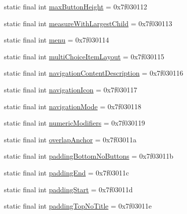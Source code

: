 \begin{DoxyCompactItemize}
\item 
static final int \mbox{\hyperlink{classandroid_1_1support_1_1design_1_1_r_1_1attr_ad6bd48f1f9241d8d9d51d7e07a5dc414}{max\+Button\+Height}} = 0x7f030112
\item 
static final int \mbox{\hyperlink{classandroid_1_1support_1_1design_1_1_r_1_1attr_abd4901da4b129c6f63b6ea0541aa8e09}{measure\+With\+Largest\+Child}} = 0x7f030113
\item 
static final int \mbox{\hyperlink{classandroid_1_1support_1_1design_1_1_r_1_1attr_a0b206635c3ea3883eb3af84863d37584}{menu}} = 0x7f030114
\item 
static final int \mbox{\hyperlink{classandroid_1_1support_1_1design_1_1_r_1_1attr_abc4a87a62e1572b883a67aa399ffe35e}{multi\+Choice\+Item\+Layout}} = 0x7f030115
\item 
static final int \mbox{\hyperlink{classandroid_1_1support_1_1design_1_1_r_1_1attr_adaadd10648090e6b2f268643da9ec3c2}{navigation\+Content\+Description}} = 0x7f030116
\item 
static final int \mbox{\hyperlink{classandroid_1_1support_1_1design_1_1_r_1_1attr_a03bf46fdb71dfdbac72b15e3efe275df}{navigation\+Icon}} = 0x7f030117
\item 
static final int \mbox{\hyperlink{classandroid_1_1support_1_1design_1_1_r_1_1attr_a98ccf0c896c65512c88eaa5f71f6aa7c}{navigation\+Mode}} = 0x7f030118
\item 
static final int \mbox{\hyperlink{classandroid_1_1support_1_1design_1_1_r_1_1attr_ac310597451040d4fb015db1b10a08767}{numeric\+Modifiers}} = 0x7f030119
\item 
static final int \mbox{\hyperlink{classandroid_1_1support_1_1design_1_1_r_1_1attr_a38b3cd3ac2e4fc75a99b4c00c01d969e}{overlap\+Anchor}} = 0x7f03011a
\item 
static final int \mbox{\hyperlink{classandroid_1_1support_1_1design_1_1_r_1_1attr_a5c03c8654610ded8325a6a89aed8adb1}{padding\+Bottom\+No\+Buttons}} = 0x7f03011b
\item 
static final int \mbox{\hyperlink{classandroid_1_1support_1_1design_1_1_r_1_1attr_a92f0312d6082074b79517cc3af4cd8c5}{padding\+End}} = 0x7f03011c
\item 
static final int \mbox{\hyperlink{classandroid_1_1support_1_1design_1_1_r_1_1attr_a9fbcc904b65b8e0195daa4225c751809}{padding\+Start}} = 0x7f03011d
\item 
static final int \mbox{\hyperlink{classandroid_1_1support_1_1design_1_1_r_1_1attr_a923e0a0fff72b4db4678dc385da1c29f}{padding\+Top\+No\+Title}} = 0x7f03011e
\item 

\end{DoxyCompactItemize}
